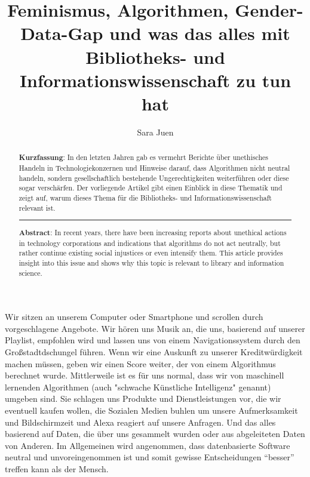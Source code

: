 \documentclass[a4paper,
fontsize=11pt,
oneside,
numbers=noperiodatend,
parskip=half-,
bibliography=totoc,
final
]{scrartcl}
\title{\LARGE{Feminismus, Algorithmen, Gender-Data-Gap und was das alles mit Bibliotheks- und Informationswissenschaft zu tun hat}}%
\author{Sara Juen} %
\date{}
\begin{document}
\maketitle
\thispagestyle{fancyplain} 

\begin{abstract}
\noindent
\textbf{Kurzfassung}: In den letzten Jahren gab es vermehrt Berichte
über unethisches Handeln in Technologiekonzernen und Hinweise darauf,
dass Algorithmen nicht neutral handeln, sondern gesellschaftlich
bestehende Ungerechtigkeiten weiterführen oder diese sogar verschärfen.
Der vorliegende Artikel gibt einen Einblick in diese Thematik und zeigt
auf, warum dieses Thema für die Bibliotheks- und
Informationswissenschaft relevant ist.

\begin{center}\rule{0.5\linewidth}{0.5pt}\end{center}

\noindent\textbf{Abstract}: In recent years, there have been increasing reports
about unethical actions in technology corporations and indications that
algorithms do not act neutrally, but rather continue existing social
injustices or even intensify them. This article provides insight into
this issue and shows why this topic is relevant to library and
information science.
\end{abstract}

Wir sitzen an unserem Computer oder Smartphone und scrollen durch
vorgeschlagene Angebote. Wir hören uns Musik an, die uns, basierend auf
unserer Playlist, empfohlen wird und lassen uns von einem
Navigationssystem durch den Großstadtdschungel führen. Wenn wir eine
Auskunft zu unserer Kreditwürdigkeit machen müssen, geben wir einen
Score weiter, der von einem Algorithmus berechnet wurde. Mittlerweile
ist es für uns normal, dass wir von maschinell lernenden Algorithmen
(auch "schwache Künstliche Intelligenz" genannt) umgeben sind. Sie
schlagen uns Produkte und Dienstleistungen vor, die wir eventuell kaufen
wollen, die Sozialen Medien buhlen um unsere Aufmerksamkeit und
Bildschirmzeit und Alexa reagiert auf unsere Anfragen. Und das alles
basierend auf Daten, die über uns gesammelt wurden oder aus abgeleiteten
Daten von Anderen. Im Allgemeinen wird angenommen, dass datenbasierte
Software neutral und unvoreingenommen ist und somit gewisse
Entscheidungen \enquote{besser} treffen kann als der Mensch.
\end{document}
